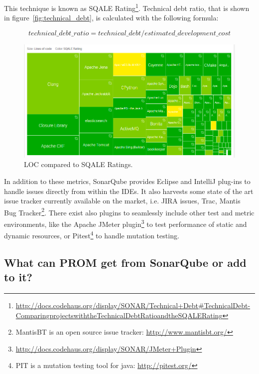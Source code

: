 This technique is known as SQALE Rating\footnote{\url{http://docs.codehaus.org/display/SONAR/Technical+Debt#TechnicalDebt-ComparingprojectswiththeTechnicalDebtRatioandtheSQALERating}}. Technical debt ratio, that is shown in
figure~\ref{fig:technical_debt}, is calculated with the following formula:

\begin{equation}
	\label{eq:technical_debt_ratio}
	technical\_debt\_ratio = technical\_debt / estimated\_development\_cost
\end{equation}

\begin{figure}[h]
	\centering
	\includegraphics[scale=0.5]{img/sqale_rating.jpg}
	\caption{LOC compared to SQALE Ratings.} 
	\label{fig:sqale_rating}
\end{figure}
	
In addition to these metrics, SonarQube provides Eclipse and IntelliJ plug-ins to
handle issues directly from within the IDEs. It also harvests some state of the
art issue tracker currently available on the market, i.e. JIRA issues, Trac,
Mantis Bug Tracker\footnote{MantisBT is an open source issue tracker:
\url{http://www.mantisbt.org/}}. There exist also plugins to seamlessly include other
test and metric environments, like the Apache JMeter
plugin\footnote{\url{http://docs.codehaus.org/display/SONAR/JMeter+Plugin}} to test
performance of
static and dynamic resources, or Pitest\footnote{PIT is a mutation testing tool for
java: \url{http://pitest.org/}} to handle mutation testing.

\subsection{What can PROM get from SonarQube or add to it?}

